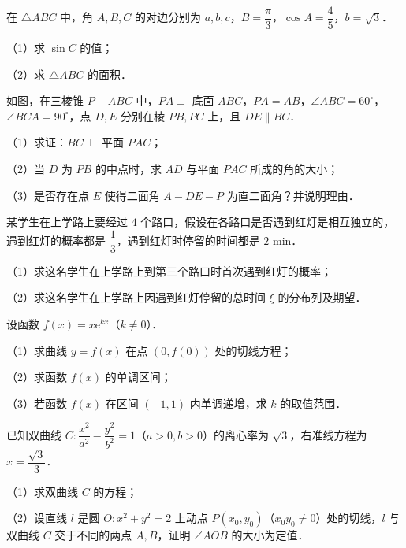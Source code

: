 \begin{question}
在 $\triangle ABC$ 中，角 $A,B,C$ 的对边分别为 $a,b,c$，$B=\dfrac{\pi}{3}$，$\cos A=\dfrac45$，$b=\sqrt3$．

（1）求 $\sin C$ 的值；

（2）求 $\triangle ABC$ 的面积．

\Needspace{0.4\textheight}
\end{question}
\begin{question}
如图，在三棱锥 $P-ABC$ 中，$PA\perp$ 底面 $ABC$，$PA=AB$，$\angle ABC=60^\circ$，$\angle BCA=90^\circ$，点 $D,E$ 分别在棱 $PB,PC$ 上，且 $DE\parallel BC$．
\nopagebreak[4]
\begin{center}\end{center}
\nopagebreak[4]
（1）求证：$BC\perp$ 平面 $PAC$；

（2）当 $D$ 为 $PB$ 的中点时，求 $AD$ 与平面 $PAC$ 所成的角的大小；

（3）是否存在点 $E$ 使得二面角 $A-DE-P$ 为直二面角？并说明理由．

\end{question}
\begin{question}
某学生在上学路上要经过 $4$ 个路口，假设在各路口是否遇到红灯是相互独立的，遇到红灯的概率都是 $\dfrac13$，遇到红灯时停留的时间都是 $2$ min．

（1）求这名学生在上学路上到第三个路口时首次遇到红灯的概率；

（2）求这名学生在上学路上因遇到红灯停留的总时间 $\xi$ 的分布列及期望．

\end{question}
\begin{question}
设函数 $f(x)=x\mathrm e^{kx}$（$k\neq0$）．

（1）求曲线 $y=f(x)$ 在点 $(0,f(0))$ 处的切线方程；

（2）求函数 $f(x)$ 的单调区间；

（3）若函数 $f(x)$ 在区间 $(-1,1)$ 内单调递增，求 $k$ 的取值范围．

\end{question}
\begin{question}
已知双曲线 $C:\dfrac{x^2}{a^2}-\dfrac{y^2}{b^2}=1$（$a>0,b>0$）的离心率为 $\sqrt3$，右准线方程为 $x=\dfrac{\sqrt3}{3}$．

（1）求双曲线 $C$ 的方程；

（2）设直线 $l$ 是圆 $O:x^2+y^2=2$ 上动点 $P(x_0,y_0)$（$x_0y_0\neq0$）处的切线，$l$ 与双曲线 $C$ 交于不同的两点 $A,B$，证明 $\angle AOB$ 的大小为定值．

\end{question}
